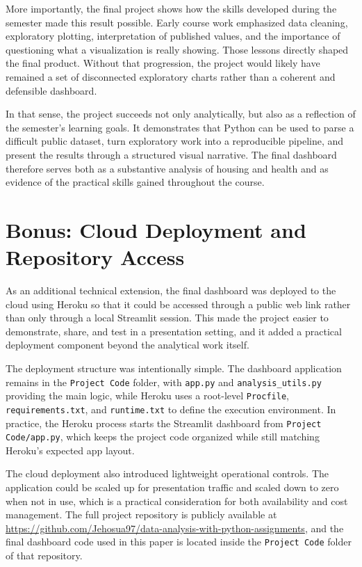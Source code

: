 \documentclass[conference]{IEEEtran}
\begin{document}
More importantly, the final project shows how the skills developed during the semester made this result possible. Early course work emphasized data cleaning, exploratory plotting, interpretation of published values, and the importance of questioning what a visualization is really showing. Those lessons directly shaped the final product. Without that progression, the project would likely have remained a set of disconnected exploratory charts rather than a coherent and defensible dashboard.

In that sense, the project succeeds not only analytically, but also as a reflection of the semester's learning goals. It demonstrates that Python can be used to parse a difficult public dataset, turn exploratory work into a reproducible pipeline, and present the results through a structured visual narrative. The final dashboard therefore serves both as a substantive analysis of housing and health and as evidence of the practical skills gained throughout the course.

\section{Bonus: Cloud Deployment and Repository Access}

As an additional technical extension, the final dashboard was deployed to the cloud using Heroku so that it could be accessed through a public web link rather than only through a local Streamlit session. This made the project easier to demonstrate, share, and test in a presentation setting, and it added a practical deployment component beyond the analytical work itself.

The deployment structure was intentionally simple. The dashboard application remains in the \texttt{Project Code} folder, with \texttt{app.py} and \texttt{analysis\_utils.py} providing the main logic, while Heroku uses a root-level \texttt{Procfile}, \texttt{requirements.txt}, and \texttt{runtime.txt} to define the execution environment. In practice, the Heroku process starts the Streamlit dashboard from \texttt{Project Code/app.py}, which keeps the project code organized while still matching Heroku's expected app layout.

The cloud deployment also introduced lightweight operational controls. The application could be scaled up for presentation traffic and scaled down to zero when not in use, which is a practical consideration for both availability and cost management. The full project repository is publicly available at \url{https://github.com/Jehosua97/data-analysis-with-python-assignments}, and the final dashboard code used in this paper is located inside the \texttt{Project Code} folder of that repository.
\end{document}
